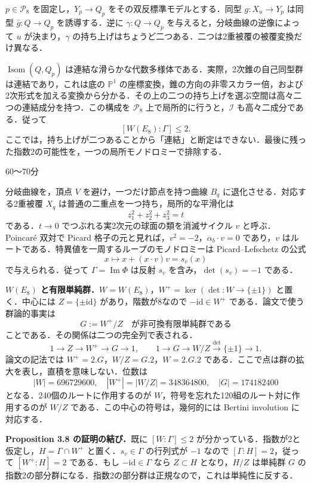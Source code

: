 \documentclass[a4paper,10pt]{ltjsarticle}
\newcommand{\PP}{\mathbb P}
\newcommand{\im}{\operatorname{Im}}
\newcommand{\Pn}{\mathcal P}
\newcommand{\I}{\mathcal I}
\newcommand{\head}[2]{\par\medskip\noindent{\large\bfseries #1}\hfill{\small #2}\par\medskip}
\begin{document}
$p\in\Pn_8$ を固定し，$Y_p\to Q_p$ をその双反標準モデルとする．同型 $g:X_u\to Y_p$ は同型 $\bar g:Q\to Q_p$ を誘導する．逆に $\gamma:Q\to Q_p$ を与えると，分岐曲線の逆像によって $u$ が決まり，$\gamma$ の持ち上げはちょうど二つある．二つは2重被覆の被覆変換だけ異なる．

$\operatorname{Isom}(Q,Q_p)$ は連結な滑らかな代数多様体である．実際，2次錐の自己同型群は連結であり，これは底の $\PP^1$ の座標変換，錐の方向の非零スカラー倍，および2次形式を加える変換から分かる．その上の二つの持ち上げを選ぶ空間は高々二つの連結成分を持つ．この構成を $\Pn_8$ 上で局所的に行うと，$\I$ も高々二成分である．従って
\[
\boxed{\ [W(E_8):\Gamma]\leq2.\ }
\]
ここでは，持ち上げが二つあることから「連結」と断定はできない．最後に残った指数2の可能性を，一つの局所モノドロミーで排除する．
\newpage
\head{5\quad 局所モノドロミーと有限単純群}{60〜70分}
分岐曲線を，頂点 $V$ を避け，一つだけ節点を持つ曲線 $B_q$ に退化させる．対応する2重被覆 $X_q$ は普通の二重点を一つ持ち，局所的な平滑化は
\[
z_1^2+z_2^2+z_3^2=t
\]
である．$t\to0$ でつぶれる実2次元の球面の類を消滅サイクル $v$ と呼ぶ．Poincar\'e 双対で Picard 格子の元と見れば，$v^2=-2$，$\alpha_b\cdot v=0$ であり，$v$ はルートである．特異値を一周するループのモノドロミーは Picard--Lefschetz の公式
\[
x\longmapsto x+(x\cdot v)v=s_v(x)
\]
で与えられる．従って $\Gamma=\im\Phi$ は反射 $s_v$ を含み，$\det(s_v)=-1$ である．

\noindent\textbf{$W(E_8)$ と有限単純群．}\quad $W=W(E_8)$，$W^+=\ker(\det:W\to\{\pm1\})$ と置く．中心には $Z=\{\pm\mathrm{id}\}$ があり，階数が8なので $-\mathrm{id}\in W^+$ である．論文で使う群論的事実は
\[
G:=W^+/Z\quad\text{が非可換有限単純群である}
\]
ことである．その関係は二つの完全列で表される．
\[
1\longrightarrow Z\longrightarrow W^+\longrightarrow G\longrightarrow1,
\qquad
1\longrightarrow G\longrightarrow W/Z\xrightarrow{\det}\{\pm1\}\longrightarrow1.
\]
論文の記法では $W^+=2.G$，$W/Z=G.2$，$W=2.G.2$ である．ここで点は群の拡大を表し，直積を意味しない．位数は
\[
|W|=696729600,\quad |W^+|=|W/Z|=348364800,\quad |G|=174182400
\]
となる．240個のルートに作用するのが $W$，符号を忘れた120組のルート対に作用するのが $W/Z$ である．この中心の符号は，幾何的には Bertini involution に対応する．

\noindent\textbf{Proposition 3.8 の証明の結び．}\quad 既に $[W:\Gamma]\leq2$ が分かっている．指数が2と仮定し，$H=\Gamma\cap W^+$ と置く．$s_v\in\Gamma$ の行列式が $-1$ なので $[\Gamma:H]=2$，従って $[W^+:H]=2$ である．もし $-\mathrm{id}\in\Gamma$ なら $Z\subset H$ となり，$H/Z$ は単純群 $G$ の指数2の部分群になる．指数2の部分群は正規なので，これは単純性に反する．
\end{document}
